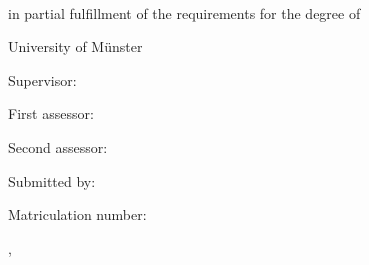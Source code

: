 \thispagestyle{empty}

\begin{center}
    
    \hfill

    \par
    \vspace*{8ex}
    {
        \linespread{0.9}
        \LARGE
        \printtitle
        \par
    }
    \normalsize
    \vspace*{8ex}
    \large
    \textsc{\printtype}\\
    \normalsize
    in partial fulfillment of the requirements for the degree of\\
    \large
    \textsc{\printdegree}
    \par
    \normalsize
    \vspace*{6ex}
    University of Münster\\
    \printinstitute
\end{center}

\par
\vspace*{4ex}
Supervisor:\\
\large
\textit{\printsupervisor}

\par
\normalsize
\vspace*{2ex}
First assessor:\\
\large
\textit{\printfirstassessor}

\par
\normalsize
\vspace*{2ex}
Second assessor:\\
\large
\textit{\printsecondassessor}

\par
\normalsize
\vspace*{2ex}
Submitted by:\\
\large
\textit{\printname}

\par
\normalsize
\vspace*{2ex}
Matriculation number:\\
\large
\textit{\printnumber}

\par
\normalsize
\vspace*{4ex}
\printcity, \makeatletter
\monthname
\makeatother~\the\year
